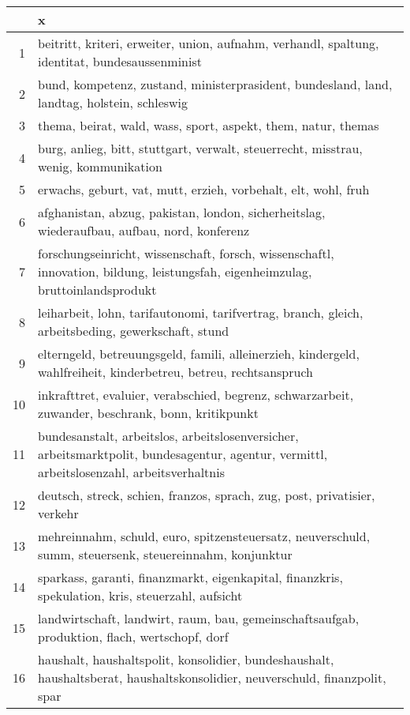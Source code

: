 \documentclass{article}
\begin{document}
 
\landscape 
\footnotesize 
\begin{table}[ht]
\begin{center}
\begin{tabular}{rl}
  \hline
 & x \\ 
  \hline
1 & beitritt, kriteri, erweiter, union, aufnahm, verhandl, spaltung, identitat, bundesaussenminist \\ 
  2 & bund, kompetenz, zustand, ministerprasident, bundesland, land, landtag, holstein, schleswig \\ 
  3 & thema, beirat, wald, wass, sport, aspekt, them, natur, themas \\ 
  4 & burg, anlieg, bitt, stuttgart, verwalt, steuerrecht, misstrau, wenig, kommunikation \\ 
  5 & erwachs, geburt, vat, mutt, erzieh, vorbehalt, elt, wohl, fruh \\ 
  6 & afghanistan, abzug, pakistan, london, sicherheitslag, wiederaufbau, aufbau, nord, konferenz \\ 
  7 & forschungseinricht, wissenschaft, forsch, wissenschaftl, innovation, bildung, leistungsfah, eigenheimzulag, bruttoinlandsprodukt \\ 
  8 & leiharbeit, lohn, tarifautonomi, tarifvertrag, branch, gleich, arbeitsbeding, gewerkschaft, stund \\ 
  9 & elterngeld, betreuungsgeld, famili, alleinerzieh, kindergeld, wahlfreiheit, kinderbetreu, betreu, rechtsanspruch \\ 
  10 & inkrafttret, evaluier, verabschied, begrenz, schwarzarbeit, zuwander, beschrank, bonn, kritikpunkt \\ 
  11 & bundesanstalt, arbeitslos, arbeitslosenversicher, arbeitsmarktpolit, bundesagentur, agentur, vermittl, arbeitslosenzahl, arbeitsverhaltnis \\ 
  12 & deutsch, streck, schien, franzos, sprach, zug, post, privatisier, verkehr \\ 
  13 & mehreinnahm, schuld, euro, spitzensteuersatz, neuverschuld, summ, steuersenk, steuereinnahm, konjunktur \\ 
  14 & sparkass, garanti, finanzmarkt, eigenkapital, finanzkris, spekulation, kris, steuerzahl, aufsicht \\ 
  15 & landwirtschaft, landwirt, raum, bau, gemeinschaftsaufgab, produktion, flach, wertschopf, dorf \\ 
  16 & haushalt, haushaltspolit, konsolidier, bundeshaushalt, haushaltsberat, haushaltskonsolidier, neuverschuld, finanzpolit, spar \\ 

\end{tabular}
\end{center}
\end{table}
\end{document}
